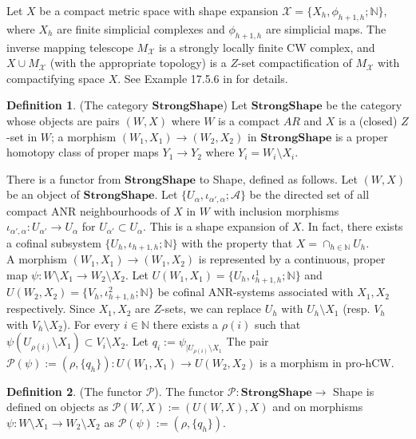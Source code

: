 \documentclass[a4paper,11pt]{article}
\theoremstyle{definition}
\newtheorem{definition}{Definition}[section]
\theoremstyle{plain}
\theoremstyle{remark}
\begin{document}
{Let $X$ be a compact metric space with shape expansion $\mathcal{X}=\{X_{h},\phi_{h+1,h};\mathbb{N}\}$, where $X_{h}$ are finite simplicial complexes and $\phi_{h+1,h}$ are simplicial maps. The inverse mapping telescope $M_{\mathcal{X}}$ is a strongly locally finite CW complex, and $X \cup M_{\mathcal{X}}$ (with the appropriate topology) is a $Z$-set compactification of $M_{\mathcal{X}}$ with compactifying space $X$. See Example 17.5.6 in \cite{geoghegan2007topological} for details. 

\begin{definition} (The category $\mathbf{StrongShape}$)
Let $\mathbf{StrongShape}$ be the category whose objects are pairs $(W,X)$ where $W$ is a compact $AR$ and $X$ is a (closed) $Z$-set in $W$; a morphism $(W_1,X_1)\rightarrow (W_2,X_2)$ in $\mathbf{StrongShape}$ is a proper homotopy class of proper maps $Y_1\rightarrow Y_2$ where $Y_{i} = W_{i}\setminus X_{i}$. 
\end{definition}

There is a functor from $\mathbf{StrongShape}$ to Shape, defined as follows. Let $(W,X)$ be an object of $\mathbf{StrongShape}$. Let $\{U_{\alpha},\iota_{\alpha',\alpha};\mathcal{A}\}$ be the directed set of all compact ANR neighbourhoods of $X$ in $W$ with inclusion morphisms $\iota_{\alpha',\alpha}: U_{\alpha'}\rightarrow U_{\alpha}$ for $U_{\alpha'} \subset U_{\alpha}$. This is a shape expansion of $X$. In fact, there exists a cofinal subsystem $\{U_{h},\iota_{h+1,h};\mathbb{N}\}$ with the property that $X=\cap_{h\in \mathbb{N}} U_{h}$.  \\

A morphism $(W_1,X_1)\rightarrow (W_{1},X_{2})$ is represented by a continuous, proper map $\psi: W\setminus X_{1}\rightarrow W_{2}\setminus X_{2}$. Let $U(W_1,X_{1})=\{U_{h},\iota^1_{h+1,h};\mathbb{N}\}$ and $U(W_{2},X_{2})=\{V_{h},\iota^2_{h+1,h};\mathbb{N}\}$ be cofinal ANR-systems associated with $X_1,X_{2}$ respectively. Since $X_{1},X_{2}$ are $Z$-sets, we can replace $U_{h}$ with $U_{h}\setminus X_{1}$ (resp. $V_{h}$ with $V_{h}\setminus X_{2}$). For every $i\in \mathbb{N}$ there exists a $\rho(i)$ such that $\psi (U_{\rho(i)}\setminus X_{1}) \subset V_{i}\setminus X_{2}$. Let $q_{i}:= \psi_{|U_{\rho(i)}\setminus X_{1}}$ The pair $\mathcal{P}(\psi):=(\rho,\{q_{h}\}): U(W_{1},X_{1})\rightarrow U(W_{2},X_{2})$ is a morphism in pro-hCW. 

\begin{definition} (The functor $\mathcal{P}$). The functor $\mathcal{P}: \mathbf{StrongShape} \rightarrow$ Shape is defined on objects as $\mathcal{P}(W,X) := (U(W,X),X)$ and on morphisms $\psi: W\setminus X_{1}\rightarrow W_{2}\setminus X_{2}$ as $\mathcal{P}(\psi) := (\rho,\{q_{h}\})$.  
\end{definition}

}
\end{document}
